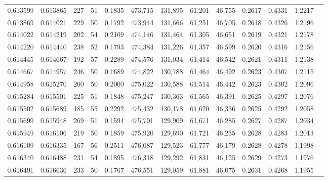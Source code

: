 \begin{tabular}{rrrrrrrrrrrrr}
0.613599 & 0.613865 &   227 &  51 &                                     0.1835 & 473,715 & 131,895 &  61,201 &  46,755 & 0.2617 & 0.4331 & 1.2217 \\
0.613869 & 0.614021 &   229 &  50 &                                     0.1792 & 473,944 & 131,666 &  61,251 &  46,705 & 0.2618 & 0.4326 & 1.2196 \\
0.614022 & 0.614219 &   202 &  54 &                                     0.2109 & 474,146 & 131,464 &  61,305 &  46,651 & 0.2619 & 0.4321 & 1.2178 \\
0.614220 & 0.614440 &   238 &  52 &                                     0.1793 & 474,384 & 131,226 &  61,357 &  46,599 & 0.2620 & 0.4316 & 1.2156 \\
0.614445 & 0.614667 &   192 &  57 &                                     0.2289 & 474,576 & 131,034 &  61,414 &  46,542 & 0.2621 & 0.4311 & 1.2138 \\
0.614667 & 0.614957 &   246 &  50 &                                     0.1689 & 474,822 & 130,788 &  61,464 &  46,492 & 0.2623 & 0.4307 & 1.2115 \\
0.614958 & 0.615270 &   200 &  50 &                                     0.2000 & 475,022 & 130,588 &  61,514 &  46,442 & 0.2623 & 0.4302 & 1.2096 \\
0.615284 & 0.615501 &   225 &  51 &                                     0.1848 & 475,247 & 130,363 &  61,565 &  46,391 & 0.2625 & 0.4297 & 1.2076 \\
0.615502 & 0.615689 &   185 &  55 &                                     0.2292 & 475,432 & 130,178 &  61,620 &  46,336 & 0.2625 & 0.4292 & 1.2058 \\
0.615699 & 0.615948 &   269 &  51 &                                     0.1594 & 475,701 & 129,909 &  61,671 &  46,285 & 0.2627 & 0.4287 & 1.2034 \\
0.615949 & 0.616106 &   219 &  50 &                                     0.1859 & 475,920 & 129,690 &  61,721 &  46,235 & 0.2628 & 0.4283 & 1.2013 \\
0.616109 & 0.616335 &   167 &  56 &                                     0.2511 & 476,087 & 129,523 &  61,777 &  46,179 & 0.2628 & 0.4278 & 1.1998 \\
0.616340 & 0.616488 &   231 &  54 &                                     0.1895 & 476,318 & 129,292 &  61,831 &  46,125 & 0.2629 & 0.4273 & 1.1976 \\
0.616491 & 0.616636 &   233 &  50 &                                     0.1767 & 476,551 & 129,059 &  61,881 &  46,075 & 0.2631 & 0.4268 & 1.1955 \\

\end{tabular}

